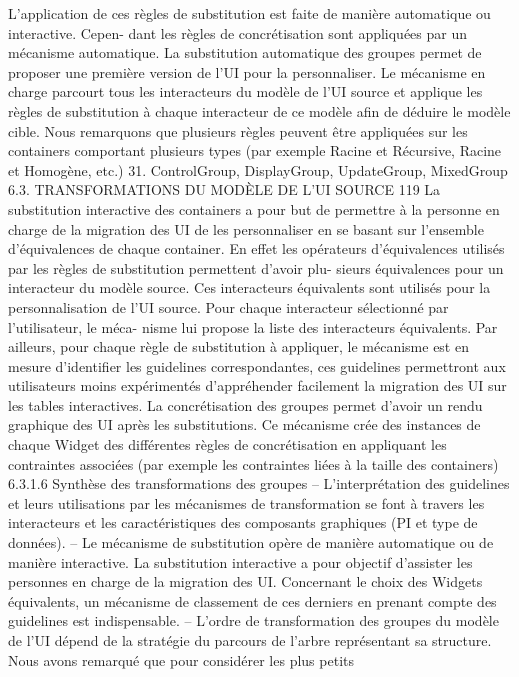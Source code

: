 \documentclass{article}
\begin{document}
L’application de ces règles de substitution est faite de manière automatique ou interactive. Cepen-
dant les règles de concrétisation sont appliquées par un mécanisme automatique.
La substitution automatique des groupes
permet de proposer une première version de l’UI pour
la personnaliser. Le mécanisme en charge parcourt tous les interacteurs du modèle de l’UI source et
applique les règles de substitution à chaque interacteur de ce modèle aﬁn de déduire le modèle cible.
Nous remarquons que plusieurs règles peuvent être appliquées sur les containers comportant plusieurs
types (par exemple Racine et Récursive, Racine et Homogène, etc.)
31. ControlGroup, DisplayGroup, UpdateGroup, MixedGroup
6.3. TRANSFORMATIONS DU MODÈLE DE L’UI SOURCE
119
La substitution interactive des containers
a pour but de permettre à la personne en charge de la
migration des UI de les personnaliser en se basant sur l’ensemble d’équivalences de chaque container.
En effet les opérateurs d’équivalences utilisés par les règles de substitution permettent d’avoir plu-
sieurs équivalences pour un interacteur du modèle source. Ces interacteurs équivalents sont utilisés
pour la personnalisation de l’UI source. Pour chaque interacteur sélectionné par l’utilisateur, le méca-
nisme lui propose la liste des interacteurs équivalents. Par ailleurs, pour chaque règle de substitution
à appliquer, le mécanisme est en mesure d’identiﬁer les guidelines correspondantes, ces guidelines
permettront aux utilisateurs moins expérimentés d’appréhender facilement la migration des UI sur les
tables interactives.
La concrétisation des groupes
permet d’avoir un rendu graphique des UI après les substitutions. Ce
mécanisme crée des instances de chaque Widget des différentes règles de concrétisation en appliquant
les contraintes associées (par exemple les contraintes liées à la taille des containers)
6.3.1.6
Synthèse des transformations des groupes
– L’interprétation des guidelines et leurs utilisations par les mécanismes de transformation se
font à travers les interacteurs et les caractéristiques des composants graphiques (PI et type de
données).
– Le mécanisme de substitution opère de manière automatique ou de manière interactive. La
substitution interactive a pour objectif d’assister les personnes en charge de la migration des
UI. Concernant le choix des Widgets équivalents, un mécanisme de classement de ces derniers
en prenant compte des guidelines est indispensable.
– L’ordre de transformation des groupes du modèle de l’UI dépend de la stratégie du parcours
de l’arbre représentant sa structure. Nous avons remarqué que pour considérer les plus petits
\end{document}
